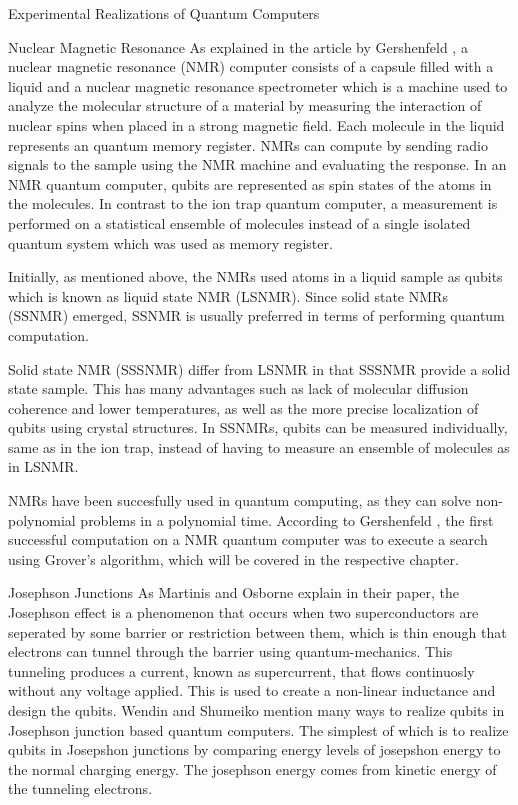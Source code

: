 \documentclass[aps,preprintnumbers,twocolumn]{revtex4}
\begin{document}
\begin{section}{Experimental Realizations of Quantum Computers}
\begin{subsection}{Nuclear Magnetic Resonance}
As explained in the article by Gershenfeld \cite[p.66-71]{Gershenfeld1998QuantumCW}, a nuclear magnetic resonance (NMR) computer consists of a capsule filled with a liquid and a nuclear magnetic resonance spectrometer which is a machine used to analyze the molecular structure of a material by measuring the interaction of nuclear spins when placed in a strong magnetic field.
Each molecule in the liquid represents an quantum memory register. 
NMRs can compute by sending radio signals to the sample using the NMR machine and evaluating the response. 
In an NMR quantum computer, qubits are represented as spin states of the atoms in the molecules. 
In contrast to the ion trap quantum computer, 
a measurement is performed on a statistical ensemble of molecules instead of a single isolated quantum system which was used as memory register. 

Initially, as mentioned above, the NMRs used atoms in a liquid sample as qubits which is known as liquid state NMR (LSNMR). 
Since solid state NMRs (SSNMR) emerged, SSNMR is usually preferred in terms of performing quantum computation.

Solid state NMR (SSSNMR) differ from LSNMR in that SSSNMR provide a solid state sample.
This has many advantages such as lack of molecular diffusion coherence and lower temperatures, as well as the more precise localization of qubits using crystal structures.
In SSNMRs, qubits can be measured individually, same as in the ion trap,
instead of having to measure an ensemble of molecules as in LSNMR. 

NMRs have been succesfully used in quantum computing, as they can solve non-polynomial problems in a polynomial time.
According to Gershenfeld \cite[p.69]{Gershenfeld1998QuantumCW}, the first successful computation on a NMR quantum computer was to execute a search using Grover's algorithm, 
which will be covered in the respective chapter. 
\end{subsection}

\begin{subsection}{Josephson Junctions}
As Martinis and Osborne explain in their paper, 
the Josephson effect is a phenomenon that occurs when two superconductors are seperated 
by some barrier or restriction between them, which is thin enough that electrons can tunnel through the barrier using quantum-mechanics. 
This tunneling produces a current, known as supercurrent, that flows continuosly without any voltage applied. 
This is used to create a non-linear inductance and design the qubits. 
Wendin and Shumeiko mention \cite[p.727]{shumeiko} many ways to realize qubits in Josephson junction based quantum computers. 
The simplest of which is to realize qubits in Josepshon junctions by comparing energy levels of josepshon energy to the normal charging energy. 
The josephson energy comes from kinetic energy of the tunneling electrons.


\end{subsection}
\end{section}
\end{document}

